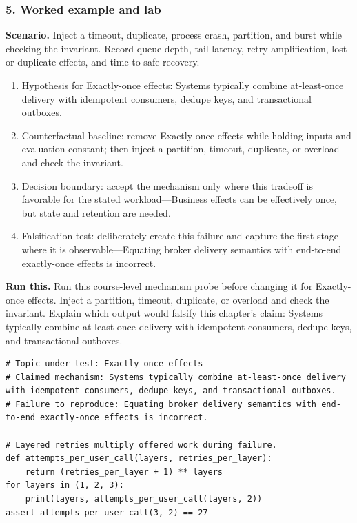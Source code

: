\subsubsection*{5. Worked example and lab}
\textbf{Scenario.} Inject a timeout, duplicate, process crash, partition, and burst while checking the invariant. Record queue depth, tail latency, retry amplification, lost or duplicate effects, and time to safe recovery.
\begin{enumerate}
\item Hypothesis for Exactly-once effects: Systems typically combine at-least-once delivery with idempotent consumers, dedupe keys, and transactional outboxes.
\item Counterfactual baseline: remove Exactly-once effects while holding inputs and evaluation constant; then inject a partition, timeout, duplicate, or overload and check the invariant.
\item Decision boundary: accept the mechanism only where this tradeoff is favorable for the stated workload—Business effects can be effectively once, but state and retention are needed.
\item Falsification test: deliberately create this failure and capture the first stage where it is observable—Equating broker delivery semantics with end-to-end exactly-once effects is incorrect.
\end{enumerate}
\textbf{Run this.} Run this course-level mechanism probe before changing it for Exactly-once effects. Inject a partition, timeout, duplicate, or overload and check the invariant. Explain which output would falsify this chapter's claim: Systems typically combine at-least-once delivery with idempotent consumers, dedupe keys, and transactional outboxes.
\begin{Verbatim}[fontsize=\scriptsize]
# Topic under test: Exactly-once effects
# Claimed mechanism: Systems typically combine at-least-once delivery with idempotent consumers, dedupe keys, and transactional outboxes.
# Failure to reproduce: Equating broker delivery semantics with end-to-end exactly-once effects is incorrect.

# Layered retries multiply offered work during failure.
def attempts_per_user_call(layers, retries_per_layer):
    return (retries_per_layer + 1) ** layers
for layers in (1, 2, 3):
    print(layers, attempts_per_user_call(layers, 2))
assert attempts_per_user_call(3, 2) == 27
\end{Verbatim}
